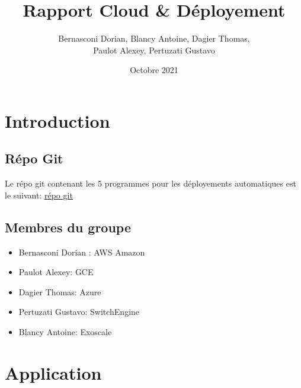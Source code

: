 \documentclass{article}
\title{Rapport Cloud & Déployement}
\author{Bernasconi Dorian, Blancy Antoine,  Dagier Thomas, 
        \\ Paulot Alexey, Pertuzati Gustavo }
\date{Octobre 2021}
\begin{document}
\maketitle

\tableofcontents

\section{Introduction}
\subsection{Répo Git}
Le répo git contenant les 5 programmes pour les déployements automatiques est le suivant:
\underline{\href{https://githepia.hesge.ch/dorian.bernasco/cloud_deployment}{répo git}}

\subsection{Membres du groupe}
\begin{itemize}
    \setlength\itemsep{-0.7em}
    \item Bernasconi Dorian : AWS Amazon \\
    \item Paulot Alexey: GCE \\
    \item Dagier Thomas: Azure \\
    \item Pertuzati Gustavo: SwitchEngine \\
    \item Blancy Antoine: Exoscale 
\end{itemize}

\section{Application}


\section{}
\end{document}
